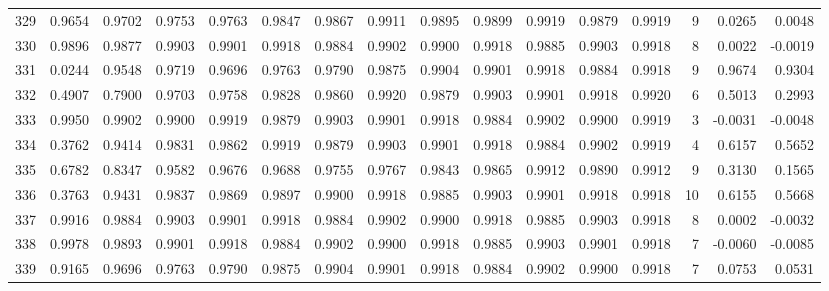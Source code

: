 \begin{tabular}{lrrrrrrrrrrrrrrr}
329 &      0.9654 &  0.9702 &  0.9753 &  0.9763 &  0.9847 &  0.9867 &  0.9911 &  0.9895 &  0.9899 &  0.9919 &   0.9879 &     0.9919 &      9 &                    0.0265 &                     0.0048 \\
330 &      0.9896 &  0.9877 &  0.9903 &  0.9901 &  0.9918 &  0.9884 &  0.9902 &  0.9900 &  0.9918 &  0.9885 &   0.9903 &     0.9918 &      8 &                    0.0022 &                    -0.0019 \\
331 &      0.0244 &  0.9548 &  0.9719 &  0.9696 &  0.9763 &  0.9790 &  0.9875 &  0.9904 &  0.9901 &  0.9918 &   0.9884 &     0.9918 &      9 &                    0.9674 &                     0.9304 \\
332 &      0.4907 &  0.7900 &  0.9703 &  0.9758 &  0.9828 &  0.9860 &  0.9920 &  0.9879 &  0.9903 &  0.9901 &   0.9918 &     0.9920 &      6 &                    0.5013 &                     0.2993 \\
333 &      0.9950 &  0.9902 &  0.9900 &  0.9919 &  0.9879 &  0.9903 &  0.9901 &  0.9918 &  0.9884 &  0.9902 &   0.9900 &     0.9919 &      3 &                   -0.0031 &                    -0.0048 \\
334 &      0.3762 &  0.9414 &  0.9831 &  0.9862 &  0.9919 &  0.9879 &  0.9903 &  0.9901 &  0.9918 &  0.9884 &   0.9902 &     0.9919 &      4 &                    0.6157 &                     0.5652 \\
335 &      0.6782 &  0.8347 &  0.9582 &  0.9676 &  0.9688 &  0.9755 &  0.9767 &  0.9843 &  0.9865 &  0.9912 &   0.9890 &     0.9912 &      9 &                    0.3130 &                     0.1565 \\
336 &      0.3763 &  0.9431 &  0.9837 &  0.9869 &  0.9897 &  0.9900 &  0.9918 &  0.9885 &  0.9903 &  0.9901 &   0.9918 &     0.9918 &     10 &                    0.6155 &                     0.5668 \\
337 &      0.9916 &  0.9884 &  0.9903 &  0.9901 &  0.9918 &  0.9884 &  0.9902 &  0.9900 &  0.9918 &  0.9885 &   0.9903 &     0.9918 &      8 &                    0.0002 &                    -0.0032 \\
338 &      0.9978 &  0.9893 &  0.9901 &  0.9918 &  0.9884 &  0.9902 &  0.9900 &  0.9918 &  0.9885 &  0.9903 &   0.9901 &     0.9918 &      7 &                   -0.0060 &                    -0.0085 \\
339 &      0.9165 &  0.9696 &  0.9763 &  0.9790 &  0.9875 &  0.9904 &  0.9901 &  0.9918 &  0.9884 &  0.9902 &   0.9900 &     0.9918 &      7 &                    0.0753 &                     0.0531 \\

\end{tabular}
